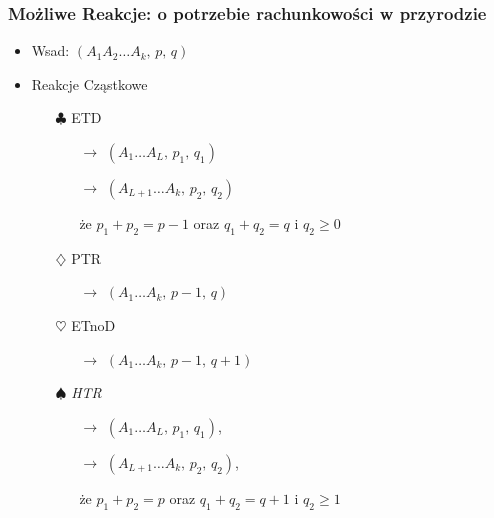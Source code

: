 \documentclass[xetex]{beamer}
\begin{document}
	\begin{frame}\frametitle{Możliwe Reakcje: o potrzebie rachunkowości w przyrodzie}
		
		\begin{itemize}
			\item Wsad: $(A_1 A_2 \dots A_k,\, p ,\, q)$ 
			\item Reakcje Cząstkowe
				\begin{itemize}
				\item[$\clubsuit$] ETD
				\begin{itemize}
					\item[$\rightarrow$] $ (A_1 \dots A_L,\, p_1,\, q_1) $
					\item[$\rightarrow$] $ (A_{L+1} \dots A_k,\, p_2,\, q_2) $
					\item[że]$p_1 + p_2 = p -1$ oraz $q_1 + q_2 = q$ i $q_2 \geq 0$
				\end{itemize}
				\item[$\diamondsuit$] PTR 
				\begin{itemize}
					\item[$\rightarrow$] $ (A_1 \dots A_k,\, p-1,\, q)$ 
				\end{itemize}
				\item[$\heartsuit$] ETnoD 
				\begin{itemize}
					\item[$\rightarrow$] $ (A_1 \dots A_k,\, p-1,\, q+1)$ 
				\end{itemize}
				\item[$\spadesuit$] \emph{HTR}
				\begin{itemize}
					\item[$\rightarrow$] $ (A_1 \dots A_L,\, p_1,\, q_1)$,
					\item[$\rightarrow$] $ (A_{L+1} \dots A_k,\, p_2,\, q_2)$,
					\item[że] $p_1 + p_2 = p$ oraz $q_1 + q_2 = q + 1$ i $q_2 \geq 1$
				\end{itemize}	
			\end{itemize}
		\end{itemize}
	\end{frame}
\end{document}

